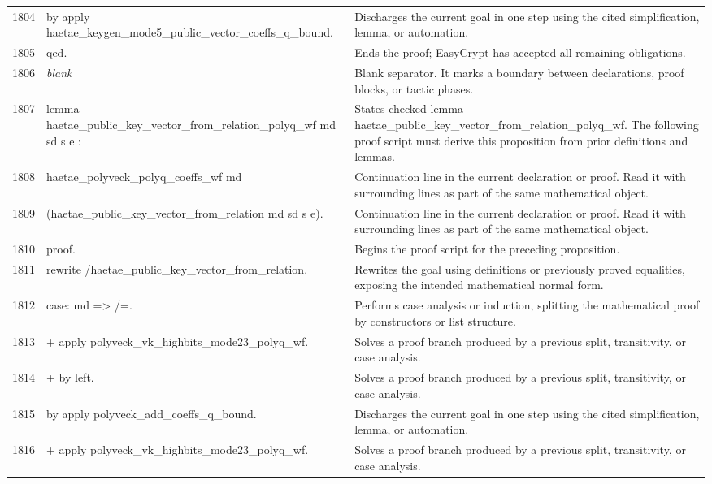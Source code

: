 \documentclass[10pt]{article}
\begin{document}
\begin{longtable}{r L{0.53\textwidth} L{0.37\textwidth}}
1804 & {\ttfamily\scriptsize by apply haetae\_keygen\_mode5\_public\_vector\_coeffs\_q\_bound.} & Discharges the current goal in one step using the cited simplification, lemma, or automation. \\
1805 & {\ttfamily\scriptsize qed.} & Ends the proof; EasyCrypt has accepted all remaining obligations. \\
1806 & {\ttfamily\scriptsize \emph{blank}} & Blank separator.  It marks a boundary between declarations, proof blocks, or tactic phases. \\
1807 & {\ttfamily\scriptsize lemma haetae\_public\_key\_vector\_from\_relation\_polyq\_wf md sd s e :} & States checked lemma haetae\_public\_key\_vector\_from\_relation\_polyq\_wf.  The following proof script must derive this proposition from prior definitions and lemmas. \\
1808 & {\ttfamily\scriptsize   haetae\_polyveck\_polyq\_coeffs\_wf md} & Continuation line in the current declaration or proof.  Read it with surrounding lines as part of the same mathematical object. \\
1809 & {\ttfamily\scriptsize     (haetae\_public\_key\_vector\_from\_relation md sd s e).} & Continuation line in the current declaration or proof.  Read it with surrounding lines as part of the same mathematical object. \\
1810 & {\ttfamily\scriptsize proof.} & Begins the proof script for the preceding proposition. \\
1811 & {\ttfamily\scriptsize rewrite /haetae\_public\_key\_vector\_from\_relation.} & Rewrites the goal using definitions or previously proved equalities, exposing the intended mathematical normal form. \\
1812 & {\ttfamily\scriptsize case: md => /=.} & Performs case analysis or induction, splitting the mathematical proof by constructors or list structure. \\
1813 & {\ttfamily\scriptsize + apply polyveck\_vk\_highbits\_mode23\_polyq\_wf.} & Solves a proof branch produced by a previous split, transitivity, or case analysis. \\
1814 & {\ttfamily\scriptsize   + by left.} & Solves a proof branch produced by a previous split, transitivity, or case analysis. \\
1815 & {\ttfamily\scriptsize   by apply polyveck\_add\_coeffs\_q\_bound.} & Discharges the current goal in one step using the cited simplification, lemma, or automation. \\
1816 & {\ttfamily\scriptsize + apply polyveck\_vk\_highbits\_mode23\_polyq\_wf.} & Solves a proof branch produced by a previous split, transitivity, or case analysis. \\

\end{longtable}
\end{document}
